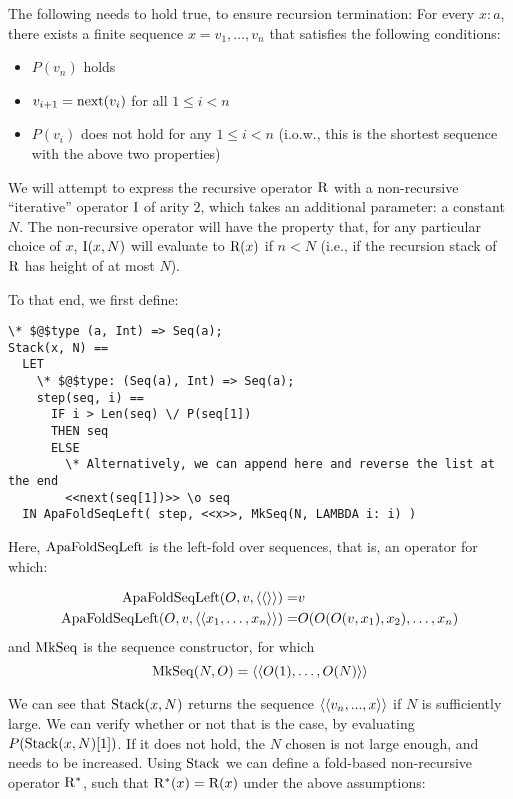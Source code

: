 The following needs to hold true, to ensure recursion termination: For every
$x\colon a$, there exists a finite sequence $x = v_1, \dots, v_n$
that satisfies the following conditions:

\begin{itemize}
\item $P(v_n)$ holds
\item $v_{i+1} = \mathrm{next}(v_i)$ for all $1 \le i < n$
\item $P(v_i)$ does not hold for any $1 \le i < n$ (i.o.w., this is the shortest sequence with the above two properties)
\end{itemize}
%

We will attempt to express the recursive operator $\mathrm{R}$ with a non-recursive
``iterative'' operator $\mathrm{I}$ of arity $2$, which takes an additional
parameter: a constant $N$. The non-recursive operator will have the property
that, for any particular choice of $x$, $\mathrm{I}(x, N)$ will evaluate to $\mathrm{R}(x)$
if $n < N$ (i.e., if the recursion stack of $\mathrm{R}$ has height of at most $N$).

%
To that end, we first define:
\begin{lstlisting}[language=tla,columns=fullflexible]
\* $@$type (a, Int) => Seq(a);
Stack(x, N) ==
  LET 
    \* $@$type: (Seq(a), Int) => Seq(a);
    step(seq, i) ==
      IF i > Len(seq) \/ P(seq[1])
      THEN seq
      ELSE 
        \* Alternatively, we can append here and reverse the list at the end
        <<next(seq[1])>> \o seq 
  IN ApaFoldSeqLeft( step, <<x>>, MkSeq(N, LAMBDA i: i) )
\end{lstlisting}
%

Here, $\mathrm{ApaFoldSeqLeft}$ is the left-fold over sequences, that is, an operator
for which:

\begin{align*}
\mathrm{ApaFoldSeqLeft}(O, v, \left<\left<\right>\right>) =& v \\
\mathrm{ApaFoldSeqLeft}(O, v, \left<\left<x_1,\dots, x_n\right>\right>) =& O(O(O(v, x_1), x_2), \dots, x_n)
\end{align*}
and $\mathrm{MkSeq}$ is the sequence constructor, for which 
\[
\mathrm{MkSeq}(N, O) = \left<\left<O(1), \dots, O(N)\right>\right>
\]
%

We can see that $\mathrm{Stack}(x,N)$ returns the sequence $\left<\left<v_n, ..., x\right>\right>$ if $N$
is sufficiently large.  We can verify whether or not that is the case, by
evaluating $P(\mathrm{Stack}(x, N)[1])$. If it does not hold, the $N$ chosen is not
large enough, and needs to be increased. Using $\mathrm{Stack}$ we can define a
fold-based non-recursive operator $\mathrm{R}^*$, such that $\mathrm{R}^*(x) = \mathrm{R}(x)$ under
the above assumptions:

